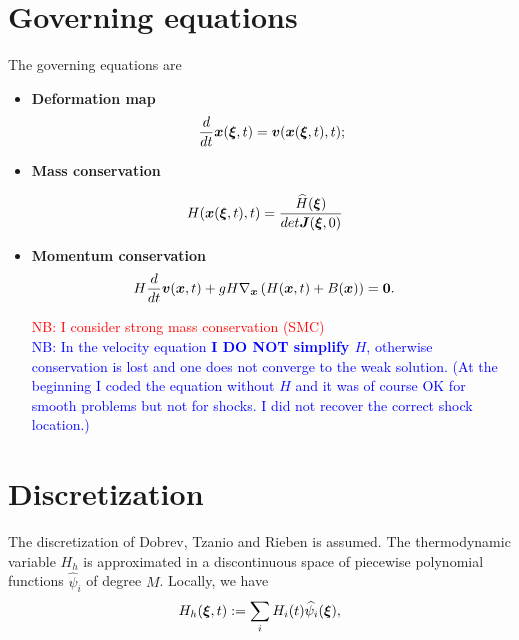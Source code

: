 \documentclass[english]{article}
\theoremstyle{thmstyleone}
\theoremstyle{thmstyletwo}
\theoremstyle{thmstylethree}
\newcommand{\uvec}[2][3]{\boldsymbol{#2\mkern-#1mu}\mkern#1mu}
\newcommand{\hpsi}{\widehat{\psi}}
\begin{document}
\section{Governing equations}
The governing equations are
\begin{itemize}
\item \textbf{Deformation map}
\begin{equation}
\frac{d}{dt}\uvec{x}(\uvec{\xi},t)=\uvec{v}(\uvec{x}(\uvec{\xi},t),t);
\end{equation}

\item \textbf{Mass conservation}

\begin{align}
&H(\uvec{x}(\uvec{\xi},t),t)=\frac{\widehat{H}(\uvec{\xi})}{det \uvec{J}(\uvec{\xi},0)}\label{eq:strong_mass_conservation}%
\end{align}

\item \textbf{Momentum conservation}
\begin{align}
&H\frac{d}{dt}\uvec{v}(\uvec{x},t)+gH\nabla_{\uvec{x}}\left(H(\uvec{x},t)+B(\uvec{x})\right)=\uvec{0}. \label{eq:momentum_wb}
\end{align}


\textcolor{red}{NB: I consider strong mass conservation (SMC)}\\
\textcolor{blue}{NB: In the velocity equation \textbf{I DO NOT simplify $H$}, otherwise conservation is lost and one does not converge to the weak solution. (At the beginning I coded the equation without $H$ and it was of course OK for smooth problems but not for shocks. I did not recover the correct shock location.)}



\end{itemize}


\section{Discretization}
The discretization of Dobrev, Tzanio and Rieben is assumed.
The thermodynamic variable $H_h$ is approximated in a discontinuous space of piecewise polynomial functions $\hpsi_i$ of degree $M$. Locally, we have
\begin{equation}
H_h(\uvec{\xi},t):=\sum_{i}H_i(t)\hpsi_i(\uvec{\xi}),
\end{equation}
\end{document}

